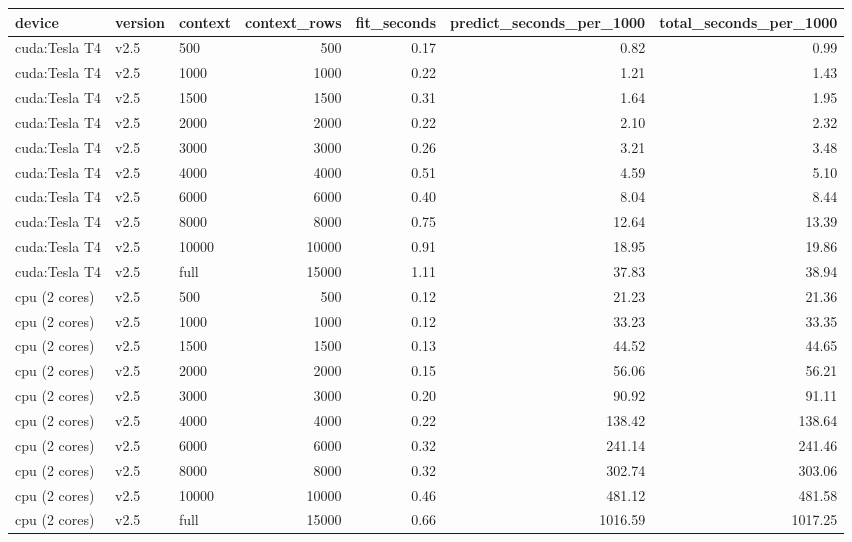 \begin{tabular}{lllrrrr}
\toprule
device & version & context & context_rows & fit_seconds & predict_seconds_per_1000 & total_seconds_per_1000 \\
\midrule
cuda:Tesla T4 & v2.5 & 500 & 500 & 0.17 & 0.82 & 0.99 \\
cuda:Tesla T4 & v2.5 & 1000 & 1000 & 0.22 & 1.21 & 1.43 \\
cuda:Tesla T4 & v2.5 & 1500 & 1500 & 0.31 & 1.64 & 1.95 \\
cuda:Tesla T4 & v2.5 & 2000 & 2000 & 0.22 & 2.10 & 2.32 \\
cuda:Tesla T4 & v2.5 & 3000 & 3000 & 0.26 & 3.21 & 3.48 \\
cuda:Tesla T4 & v2.5 & 4000 & 4000 & 0.51 & 4.59 & 5.10 \\
cuda:Tesla T4 & v2.5 & 6000 & 6000 & 0.40 & 8.04 & 8.44 \\
cuda:Tesla T4 & v2.5 & 8000 & 8000 & 0.75 & 12.64 & 13.39 \\
cuda:Tesla T4 & v2.5 & 10000 & 10000 & 0.91 & 18.95 & 19.86 \\
cuda:Tesla T4 & v2.5 & full & 15000 & 1.11 & 37.83 & 38.94 \\
cpu (2 cores) & v2.5 & 500 & 500 & 0.12 & 21.23 & 21.36 \\
cpu (2 cores) & v2.5 & 1000 & 1000 & 0.12 & 33.23 & 33.35 \\
cpu (2 cores) & v2.5 & 1500 & 1500 & 0.13 & 44.52 & 44.65 \\
cpu (2 cores) & v2.5 & 2000 & 2000 & 0.15 & 56.06 & 56.21 \\
cpu (2 cores) & v2.5 & 3000 & 3000 & 0.20 & 90.92 & 91.11 \\
cpu (2 cores) & v2.5 & 4000 & 4000 & 0.22 & 138.42 & 138.64 \\
cpu (2 cores) & v2.5 & 6000 & 6000 & 0.32 & 241.14 & 241.46 \\
cpu (2 cores) & v2.5 & 8000 & 8000 & 0.32 & 302.74 & 303.06 \\
cpu (2 cores) & v2.5 & 10000 & 10000 & 0.46 & 481.12 & 481.58 \\
cpu (2 cores) & v2.5 & full & 15000 & 0.66 & 1016.59 & 1017.25 \\
\bottomrule
\end{tabular}
